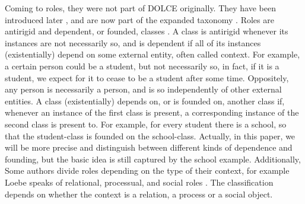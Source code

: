 \documentclass[sw]{iosart2x}
\newcommand{\DOLCE}{\textsc{DOLCE}\xspace} %
\newcommand{\TODO}[1]{{\color{red} #1}}
\begin{document}
Coming to roles, they were not part of \DOLCE originally. They have been introduced later \cite{masoloSocialRolesTheir2004}, and are now part of the expanded taxonomy \cite{borgoDOLCEDescriptiveOntology2022}.
Roles are antirigid and dependent, or founded, classes \cite{guarinoOverviewOntoClean2009, guarinoFormalOntologyProperties2000,masoloSocialRolesTheir2004}. 
A class is antirigid whenever its instances are not necessarily so, and is dependent if all of its instances (existentially) depend on some external entity, often called context.
For example, a certain person could be a student, but not necessarily so, in fact, if it is a student, we expect for it to cease to be a student after some time. 
Oppositely, any person is necessarily a person, and is so independently of other external entities.
A class (existentially) depends on, or is founded on, another class if, whenever an instance of the first class is present, a corresponding instance of the second class is present to.
For example, for every student there is a school, so that the student-class is founded on the school-class. Actually, in this paper, we will be more precise and distinguish between different kinds of dependence and founding, but the basic idea is still captured by the school example. 
Additionally, Some authors divide roles depending on the type of their context, 
for example Loebe speaks of relational, processual, and social roles \cite{loebeAbstractVsSocial2007}. The classification depends on whether the context is a relation, a process or a social object. %
\end{document}
